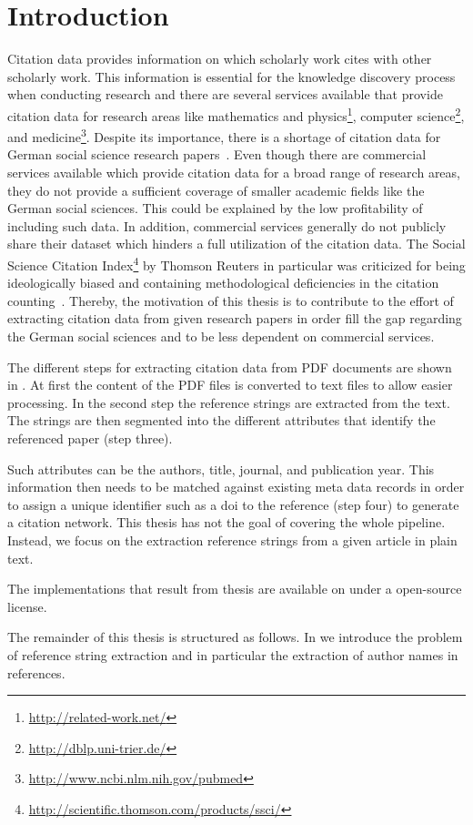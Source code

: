 \chapter{Introduction}\label{cha:introduction}



Citation data provides information on which scholarly work cites with other scholarly work.
This information is essential for the knowledge discovery process when conducting research and there are several services available that provide citation data for research areas like mathematics and physics\footnote{\url{http://related-work.net/}}, computer science\footnote{\url{http://dblp.uni-trier.de/}}, and medicine\footnote{\url{http://www.ncbi.nlm.nih.gov/pubmed}}.
Despite its importance, there is a shortage of citation data for German social science research papers~\cite{herb2015open}.
Even though there are commercial services available which provide citation data for a broad range of research areas, they do not provide a sufficient coverage of smaller academic fields like the German social sciences.
This could be explained by the low profitability of including such data.
In addition, commercial services generally do not publicly share their dataset which hinders a full utilization of the citation data.
The Social Science Citation Index\footnote{\url{http://scientific.thomson.com/products/ssci/}} by Thomson Reuters in particular was criticized for being ideologically biased and containing methodological deficiencies in the citation counting~\cite{klein2004social}.
Thereby, the motivation of this thesis is to contribute to the effort of extracting citation data from given research papers in order fill the gap regarding the German social sciences and to be less dependent on commercial services.

\bigskip

The different steps for extracting citation data from PDF documents are shown in .
At first the content of the PDF files is converted to text files to allow easier processing.
In the second step the reference strings are extracted from the text.
The strings are then segmented into the different attributes that identify the referenced paper (step three).

Such attributes can be the authors, title, journal, and publication year.
This information then needs to be matched against existing meta data records in order to assign a unique identifier such as a \gls{doi} to the reference (step four) to generate a citation network.
This thesis has not the goal of covering the whole pipeline.
Instead, we focus on the extraction reference strings from a given article in plain text.


The implementations that result from thesis are available on  under a open-source license.


The remainder of this thesis is structured as follows.
In  we introduce the problem of reference string extraction and in particular the extraction of author names in references.

